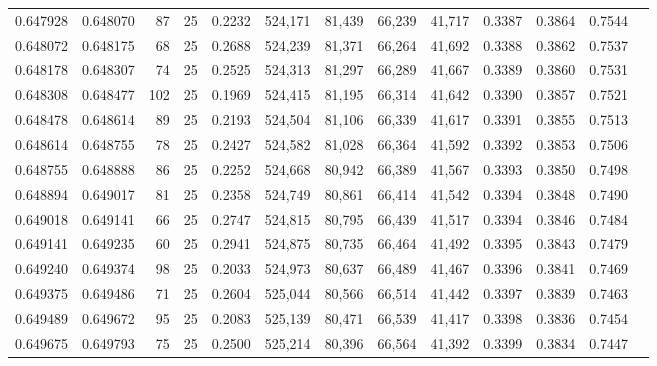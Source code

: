 \begin{tabular}{rrrrrrrrrrrrr}
0.647928 & 0.648070 &    87 &  25 &                                     0.2232 & 524,171 &  81,439 &  66,239 &  41,717 & 0.3387 & 0.3864 & 0.7544 \\
0.648072 & 0.648175 &    68 &  25 &                                     0.2688 & 524,239 &  81,371 &  66,264 &  41,692 & 0.3388 & 0.3862 & 0.7537 \\
0.648178 & 0.648307 &    74 &  25 &                                     0.2525 & 524,313 &  81,297 &  66,289 &  41,667 & 0.3389 & 0.3860 & 0.7531 \\
0.648308 & 0.648477 &   102 &  25 &                                     0.1969 & 524,415 &  81,195 &  66,314 &  41,642 & 0.3390 & 0.3857 & 0.7521 \\
0.648478 & 0.648614 &    89 &  25 &                                     0.2193 & 524,504 &  81,106 &  66,339 &  41,617 & 0.3391 & 0.3855 & 0.7513 \\
0.648614 & 0.648755 &    78 &  25 &                                     0.2427 & 524,582 &  81,028 &  66,364 &  41,592 & 0.3392 & 0.3853 & 0.7506 \\
0.648755 & 0.648888 &    86 &  25 &                                     0.2252 & 524,668 &  80,942 &  66,389 &  41,567 & 0.3393 & 0.3850 & 0.7498 \\
0.648894 & 0.649017 &    81 &  25 &                                     0.2358 & 524,749 &  80,861 &  66,414 &  41,542 & 0.3394 & 0.3848 & 0.7490 \\
0.649018 & 0.649141 &    66 &  25 &                                     0.2747 & 524,815 &  80,795 &  66,439 &  41,517 & 0.3394 & 0.3846 & 0.7484 \\
0.649141 & 0.649235 &    60 &  25 &                                     0.2941 & 524,875 &  80,735 &  66,464 &  41,492 & 0.3395 & 0.3843 & 0.7479 \\
0.649240 & 0.649374 &    98 &  25 &                                     0.2033 & 524,973 &  80,637 &  66,489 &  41,467 & 0.3396 & 0.3841 & 0.7469 \\
0.649375 & 0.649486 &    71 &  25 &                                     0.2604 & 525,044 &  80,566 &  66,514 &  41,442 & 0.3397 & 0.3839 & 0.7463 \\
0.649489 & 0.649672 &    95 &  25 &                                     0.2083 & 525,139 &  80,471 &  66,539 &  41,417 & 0.3398 & 0.3836 & 0.7454 \\
0.649675 & 0.649793 &    75 &  25 &                                     0.2500 & 525,214 &  80,396 &  66,564 &  41,392 & 0.3399 & 0.3834 & 0.7447 \\

\end{tabular}
